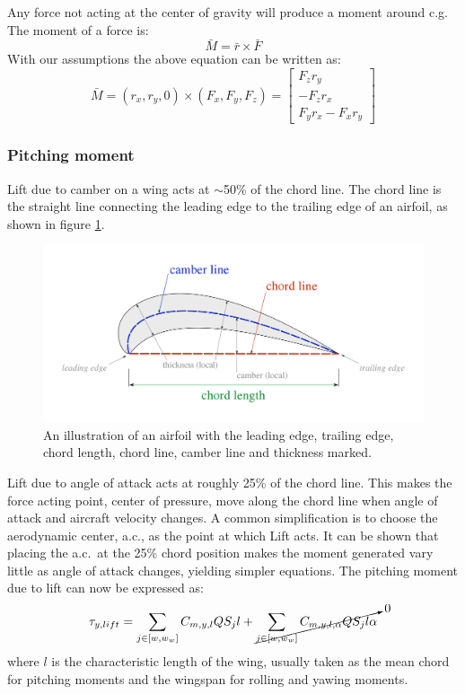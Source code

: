 Any force not acting at the center of gravity will produce a moment around c.g.
The moment of a force is:
\begin{equation}
    \bar{M} = \bar{r} \times \bar{F}
\end{equation}
With our assumptions the above equation can be written as:
\begin{equation}
    \bar{M} = (r_x, r_y, 0) \times (F_x, F_y, F_z) = 
    \left[ \begin{matrix}
    F_z r_y \\
    -F_z r_x \\
    F_y r_x - F_x r_y \end{matrix} \right]
\end{equation}

\subsubsection{Pitching moment}
Lift due to camber on a wing acts at $\sim$50\% of the chord line.
The chord line is the straight line connecting the leading edge to the trailing edge of an airfoil, as shown in figure \ref{fig:chord}.
\begin{figure}[h]
    \center
    \includegraphics[width=0.8\linewidth]{chord.png}
    \caption{An illustration of an airfoil with the leading edge, trailing edge, chord length, chord line, camber line and thickness marked.}
    \label{fig:chord}
\end{figure}
Lift due to angle of attack acts at roughly 25\% of the chord line.\cite{aerodynamics}
This makes the force acting point, center of pressure, move along the chord line when angle of attack and aircraft velocity changes.
A common simplification is to choose the aerodynamic center, a.c., as the point at which Lift acts.\cite{aerodynamics}
It can be shown that placing the a.c.~at the 25\% chord position 
makes the moment generated vary little as angle of attack changes, yielding simpler equations.
The pitching moment due to lift can now be expressed as:
\begin{equation}
    \tau_{y,lift} = \sum_{j \in [w, w_w]}
    C_{m,y,l} Q S_j l +  \cancelto{0}{\sum_{j \in [w, w_w]}
    C_{m,y,l,\alpha} Q S_j l \alpha}
\end{equation}
where $l$ is the characteristic length of the wing, usually taken as the mean chord for pitching moments and the wingspan for rolling and yawing moments.

